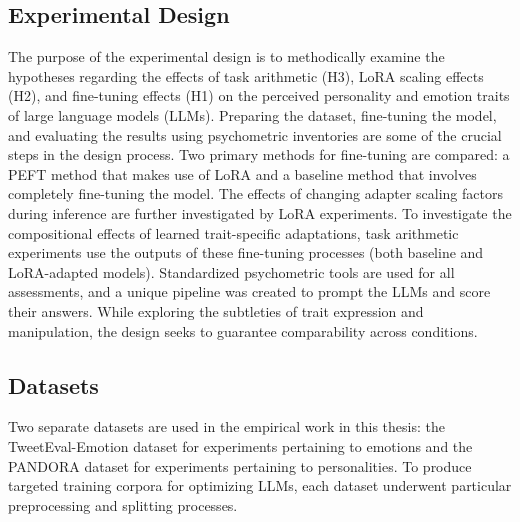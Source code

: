 \documentclass{DESSThesis}
\begin{document}
\subsection{Experimental Design}
The purpose of the experimental design is to methodically examine the hypotheses regarding the effects of task arithmetic (H3), LoRA scaling effects (H2), and fine-tuning effects (H1) on the perceived personality and emotion traits of large language models (LLMs). Preparing the dataset, fine-tuning the model, and evaluating the results using psychometric inventories are some of the crucial steps in the design process. Two primary methods for fine-tuning are compared: a PEFT method that makes use of LoRA and a baseline method that involves completely fine-tuning the model. The effects of changing adapter scaling factors during inference are further investigated by LoRA experiments. To investigate the compositional effects of learned trait-specific adaptations, task arithmetic experiments use the outputs of these fine-tuning processes (both baseline and LoRA-adapted models). Standardized psychometric tools are used for all assessments, and a unique pipeline was created to prompt the LLMs and score their answers. While exploring the subtleties of trait expression and manipulation, the design seeks to guarantee comparability across conditions.

\subsection{Datasets}
Two separate datasets are used in the empirical work in this thesis: the TweetEval-Emotion dataset for experiments pertaining to emotions and the PANDORA dataset for experiments pertaining to personalities. To produce targeted training corpora for optimizing LLMs, each dataset underwent particular preprocessing and splitting processes.
\end{document}
